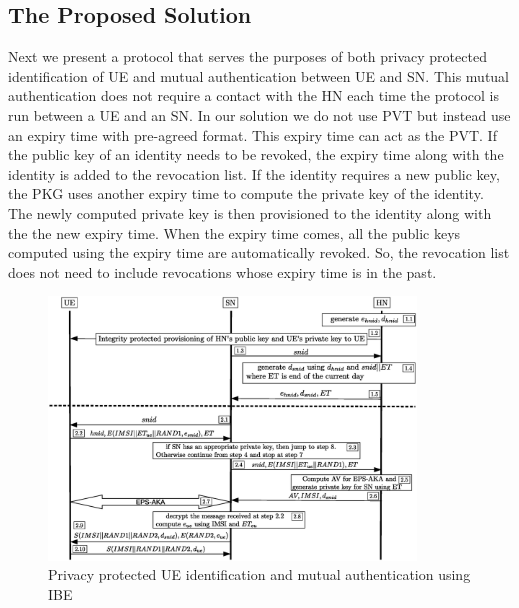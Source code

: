 \documentclass{llncs} %
\begin{document}
\subsection{The Proposed Solution}
Next we present a protocol that serves the purposes of both privacy protected identification of UE and mutual authentication between UE and SN. This mutual authentication does not require a contact with the HN each time the protocol is run between a UE and an SN. In our solution we do not use PVT but instead use an expiry time with pre-agreed format. This expiry time can act as the PVT. If the public key of an identity needs to be revoked, the expiry time along with the identity is added to the revocation list. If the identity requires a new public key, the PKG uses another expiry time to compute the private key of the identity. The newly computed private key is then provisioned to the identity along with the the new expiry time. When the expiry time comes, all the public keys computed using the expiry time are automatically revoked. So, the revocation list does not need to include revocations whose expiry time is in the past.

\begin{figure}
\vspace{-.7cm}
\begin{center}
  \includegraphics[height=7cm]{solution_based_on_ibc.eps}
\vspace{-.5cm}
\caption{Privacy protected UE identification and mutual authentication using IBE}
\label{fig:solution_ibc}       %
\end{center}
\vspace{-1cm}
\end{figure}
\end{document}
